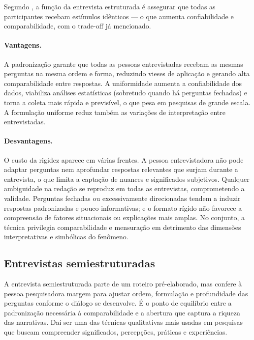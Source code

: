 \documentclass[12pt, a4paper, openany]{book}
\begin{document}
Segundo \citet{patton1990qualitative}, a fun\c{c}\~ao da entrevista estruturada \'e assegurar que todas as participantes recebam est\'imulos id\^enticos --- o que aumenta confiabilidade e comparabilidade, com o trade-off j\'a mencionado.

\paragraph{Vantagens.} A padroniza\c{c}\~ao garante que todas as pessoas entrevistadas recebam as mesmas perguntas na mesma ordem e forma, reduzindo vieses de aplica\c{c}\~ao e gerando alta comparabilidade entre respostas. A uniformidade aumenta a confiabilidade dos dados, viabiliza an\'alises estat\'isticas (sobretudo quando h\'a perguntas fechadas) e torna a coleta mais r\'apida e previs\'ivel, o que pesa em pesquisas de grande escala. A formula\c{c}\~ao uniforme reduz tamb\'em as varia\c{c}\~oes de interpreta\c{c}\~ao entre entrevistadas.

\paragraph{Desvantagens.} O custo da rigidez aparece em v\'arias frentes. A pessoa entrevistadora n\~ao pode adaptar perguntas nem aprofundar respostas relevantes que surjam durante a entrevista, o que limita a capta\c{c}\~ao de nuances e significados subjetivos. Qualquer ambiguidade na reda\c{c}\~ao se reproduz em todas as entrevistas, comprometendo a validade. Perguntas fechadas ou excessivamente direcionadas tendem a induzir respostas padronizadas e pouco informativas; e o formato r\'igido n\~ao favorece a compreens\~ao de fatores situacionais ou explica\c{c}\~oes mais amplas. No conjunto, a t\'ecnica privilegia comparabilidade e mensura\c{c}\~ao em detrimento das dimens\~oes interpretativas e simb\'olicas do fen\^omeno.

\subsection{Entrevistas semiestruturadas}

A entrevista semiestruturada parte de um roteiro pr\'e-elaborado, mas confere \`a pessoa pesquisadora margem para ajustar ordem, formula\c{c}\~ao e profundidade das perguntas conforme o di\'alogo se desenvolve. \'E o ponto de equil\'ibrio entre a padroniza\c{c}\~ao necess\'aria \`a comparabilidade e a abertura que captura a riqueza das narrativas. Da\'i ser uma das t\'ecnicas qualitativas mais usadas em pesquisas que buscam compreender significados, percep\c{c}\~oes, pr\'aticas e experi\^encias.
\end{document}
